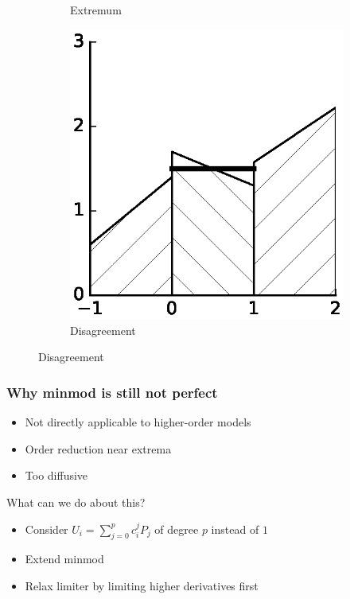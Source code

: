 \documentclass[11pt]{beamer}
\begin{document}
\begin{frame}
\begin{figure}[h]
\begin{subfigure}{0.3\textwidth}
      \caption{Extremum}
    \end{subfigure}
    \hfill
    \begin{subfigure}{0.3\textwidth}
      \centering
      \includegraphics[width=\textwidth]{figures/minmod/disagreement}
      \caption{Disagreement}
    \end{subfigure}
  \end{figure}
\end{frame}

\begin{frame}
  \frametitle{Why minmod is still not perfect}
  \begin{itemize}
  \item Not directly applicable to higher-order models
  \item Order reduction near extrema
  \item Too diffusive
  \end{itemize}

  \vspace{2em}

  What can we do about this?
  \begin{itemize}
  \item Consider $U_{i} = \sum_{j = 0}^{p} c_{i}^{j} P_{j}$ of degree $p$ instead of $1$
  \item Extend minmod
  \item Relax limiter by limiting higher derivatives first
  \end{itemize}
\end{frame}
\end{document}
